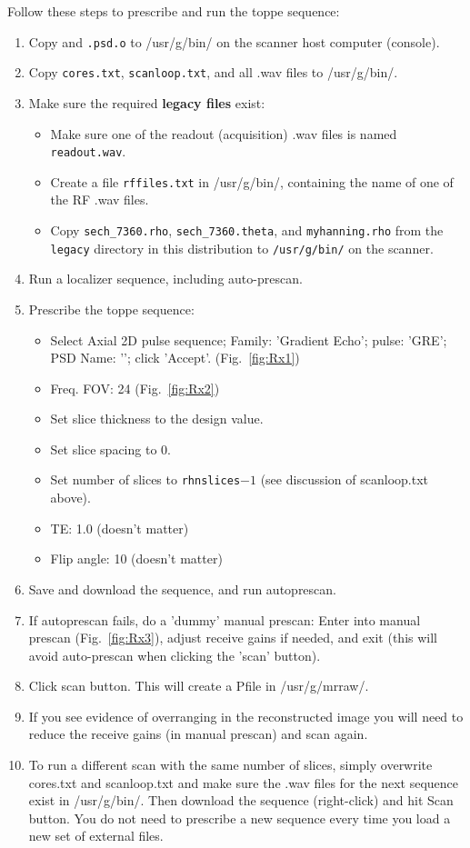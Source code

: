 Follow these steps to prescribe and run the toppe sequence:
\begin{enumerate}
	\item Copy {\tt \psdname} and {\tt \psdname.psd.o} to /usr/g/bin/ on the scanner host computer (console).
	\item Copy {\tt cores.txt}, {\tt scanloop.txt}, and all .wav files to /usr/g/bin/.
	\item Make sure the required \textbf{legacy files} exist:
	\begin{itemize}
		\item Make sure one of the readout (acquisition) .wav files is named {\tt readout.wav}.
		\item Create a file {\tt rffiles.txt} in /usr/g/bin/, containing the name of one of the RF .wav files.
		\item Copy \texttt{sech\_7360.rho}, \texttt{sech\_7360.theta}, and \texttt{myhanning.rho} from the \texttt{legacy} directory in this distribution to \texttt{/usr/g/bin/} on the scanner.
	\end{itemize}
	\item Run a localizer sequence, including auto-prescan.
	\item Prescribe the toppe sequence:
\begin{itemize}
	\item Select Axial 2D pulse sequence; Family: 'Gradient Echo'; pulse: 'GRE'; PSD Name: '\psdname'; click 'Accept'. (Fig.~\ref{fig:Rx1})
	\item Freq. FOV: 24 (Fig.~\ref{fig:Rx2})
	\item Set slice thickness to the design value.
	\item Set slice spacing to 0.
	\item Set number of slices to {\tt rhnslices}$-1$ (see discussion of scanloop.txt above).
	\item TE: 1.0   (doesn't matter)
	\item Flip angle: 10  (doesn't matter)
\end{itemize}
	\item Save and download the sequence, and run autoprescan.
	\item If autoprescan fails, do a 'dummy' manual prescan: Enter into manual prescan (Fig.~\ref{fig:Rx3}), adjust receive gains if needed, and exit (this will avoid auto-prescan when clicking the 'scan' button).
	\item Click scan button. This will create a Pfile in /usr/g/mrraw/.
	\item If you see evidence of overranging in the reconstructed image you will need to reduce the receive gains (in manual prescan) and scan again.
	\item To run a different scan with the same number of slices, simply overwrite cores.txt and scanloop.txt and make sure the .wav files for the next sequence exist in /usr/g/bin/. Then download the sequence (right-click) and hit Scan button. You do not need to prescribe a new sequence every time you load a new set of external files.
\end{enumerate}

